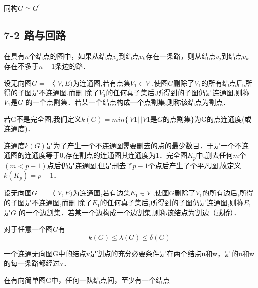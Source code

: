 \begin{definition}{}
同构$G \simeq G ^ { \prime }$
\end{definition}
\subsection{7-2 路与回路}
\begin{theorem}{}
在具有$n$个结点的图中，如果从结点$v_j$到结点$v_k$存在一条路，则从结点$v_j$到结点$v_k$存在不多于$n-1$条边的路．
\end{theorem}
\begin{definition}{}
设无向图$G=〈V,E)$为连通图,若有点集$V_1 \in V$
,使图$G$删除了$V_1$的所有结点后,所得的子图是不连通图,而删
除了$V_1$的任何真子集后,所得到的子图仍是连通图,则称$V_1$是$G$
的一个点割集．若某一个结点构成一个点割集,则称该结点为割点．

\end{definition}
若G不是完全图,我们定义$k(G)=min \{ |V1|\ | V1$是$G$的点割集$\}$为G的点连通度(或连通度)．



连通度$k(G)$是为了产生一个不连通图需要删去的点的最少数目．于是一个不连通图的连通度等于$0$,存在割点的连通图其连通度为$1$．完全图$K_p$中,删去任何$m$个$(m<p-1)$点后仍是连通图,但是删去了$p-1$个点后产生了个平凡图,故定义$k(K_p)=p-1$．
\begin{definition}{}
设无向图$G=〈V,E)$为连通图,若有边集$E_1 \in V$
,使图$G$删除了$V_1$的所有边后,所得的子图是不连通图,而删
除了$E_1$的任何真子集后,所得到的子图仍是连通图,则称$E_1$是$G$
的一个边割集．若某一个边构成一个边割集,则称该结点为割边（或桥）．
\end{definition}

\begin{theorem}{}
对于任意一个图$G$有
$$k(G)\leq \lambda(G) \leq \delta(G)$$
\end{theorem}
\begin{theorem}{}
一个连通无向图G中的结点v是割点的充分必要条件是存两个结点u和w，是的u和w的每一条路都经过v．
\end{theorem}

\begin{definition}{}
在有向简单图G中，任何一队结点间，至少有一个结点
\end{definition}

